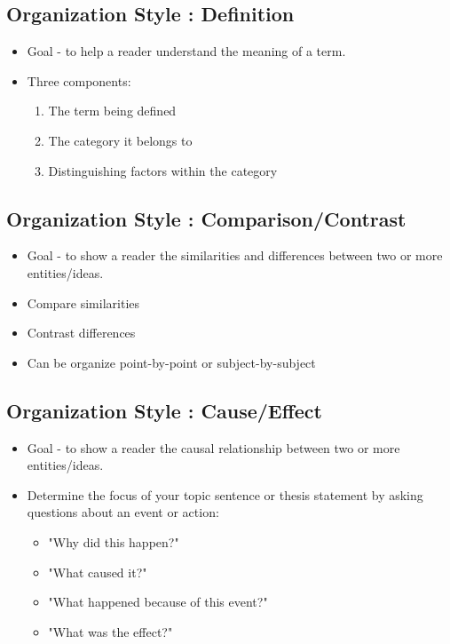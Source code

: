 \documentclass[12pt]{article}
\begin{document}
    \subsection{Organization Style : Definition}
    \begin{itemize}
        \item Goal - to help a reader understand the meaning of a term.
	\item Three components:
	\begin{enumerate}
	    \item The term being defined
            \item The category it belongs to
	    \item Distinguishing factors within the category
        \end{enumerate}
    \end{itemize}

    \subsection{Organization Style : Comparison/Contrast}
    \begin{itemize}
        \item Goal - to show a reader the similarities and differences between two or more entities/ideas.
	\item Compare similarities
	\item Contrast differences
	\item Can be organize point-by-point or subject-by-subject
    \end{itemize}

    \subsection{Organization Style : Cause/Effect}
    \begin{itemize}
        \item Goal - to show a reader the causal relationship between two or more entities/ideas.
	\item Determine the focus of your topic sentence or thesis statement by asking questions about an event or action:
        \begin{itemize}
	    \item "Why did this happen?"
            \item "What caused it?"
            \item "What happened because of this event?"
	    \item "What was the effect?"
	\end{itemize}
    \end{itemize}
\end{document}
